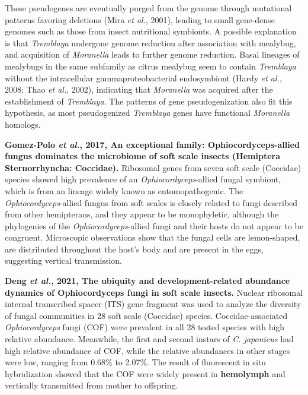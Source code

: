 \documentclass[11pt]{article}
\begin{document}
\begin{sloppypar}
These pseudogenes are eventually purged from the genome through mutational patterns favoring deletions (Mira \textit{et al.}, 2001), leading to small gene-dense genomes such as those from insect nutritional symbionts. 
A possible explanation is that \textit{Tremblaya} undergone genome reduction after association with mealybug, and acquisition of \textit{Moranella} leads to further genome reduction. 
Basal lineages of mealybugs in the same subfamily as citrus mealybug seem to contain \textit{Tremblaya} without the intracellular gammaproteobacterial endosymbiont (Hardy \textit{et al.}, 2008; Thao \textit{et al.}, 2002), indicating that \textit{Moranella} was acquired after the establishment of \textit{Tremblaya}. 
The patterns of gene pseudogenization also fit this hypothesis, as most pseudogenized \textit{Tremblaya} genes have functional \textit{Moranella} homologs.
\par
\textbf{Gomez-Polo \textit{et al.}, 2017, An exceptional family: Ophiocordyceps-allied fungus dominates the microbiome of soft scale insects (Hemiptera Sternorrhyncha: Coccidae).} \newline
Ribosomal genes from seven soft scale (Coccidae) species showed high prevalence of an \textit{Ophiocordyceps}-allied fungal symbiont, which is from an lineage widely known as entomopathogenic. 
The \textit{Ophiocordyceps}-allied fungus from soft scales is closely related to fungi described from other hemipterans, and they appear to be monophyletic, although the phylogenies of the \textit{Ophiocordyceps}-allied fungi and their hosts do not appear to be congruent. 
Microscopic observations show that the fungal cells are lemon-shaped, are distributed throughout the host’s body and are
present in the eggs, suggesting vertical transmission.
\par
\textbf{Deng \textit{et al.}, 2021, The ubiquity and development-related abundance dynamics of Ophiocordyceps fungi in soft scale insects.} \newline
Nuclear ribosomal internal transcribed spacer (ITS) gene fragment was used to analyze the diversity of fungal communities in 28 soft scale (Coccidae) species. 
Coccidae-associated \textit{Ophiocordyceps} fungi (COF) were prevalent in all 28 tested species with high relative abundance. 
Meanwhile, the first and second instars of \textit{C. japonicus} had high relative abundance of COF, while the relative
abundances in other stages were low, ranging from 0.68\% to 2.07\%. 
The result of fluorescent in situ hybridization showed that the COF were widely present in \textbf{hemolymph} and vertically transmitted from mother to offspring. 

\end{sloppypar}
\end{document}

